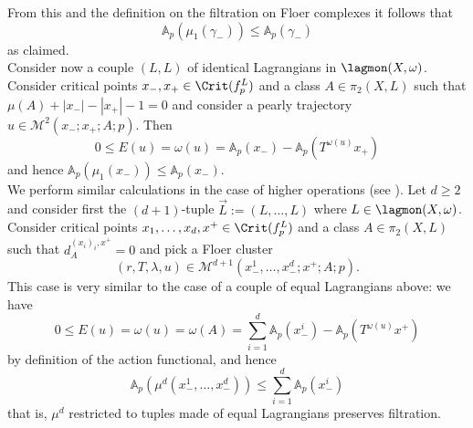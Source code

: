 	\noindent From this and the definition on the filtration on Floer complexes it follows that $$\mathbb{A}_p(\mu_1(\gamma_-))\leq \mathbb{A}_p(\gamma_-)$$ as claimed.\\ Consider now a couple $(L,L)$ of identical Lagrangians in $\lagmon(X,\omega)$. Consider critical points $x_-,x_+\in \Crit(f^L_p)$ and a class $A\in \pi_2(X,L)$ such that $\mu(A)+|x_-|-|x_+|-1=0$ and consider a pearly trajectory $u\in \mathcal{M}^2(x_-;x_+;A;p)$. Then $$0\leq E(u)= \omega(u) = \mathbb{A}_p(x_-)-\mathbb{A}_p(T^{\omega(u)}x_+)$$ and hence $\mathbb{A}_p(\mu_1(x_-))\leq\mathbb{A}_p(x_-)$.\\ 
	We perform similar calculations in the case of higher operations (see \cite{Se:book-fukaya-categ, Bi-Co:lcob-fuk}). Let $d\geq 2$ and consider first the $(d+1)$-tuple $\vec{L}:=(L,\ldots,L)$ where $L\in\lagmon(X,\omega)$. Consider critical points $x_1,\ldots,x_d,x^+\in \Crit(f^L_p)$ and a class $A\in \pi_2(X,L)$ such that $d_{A}^{(x_i)_i,x^+}=0$ and pick a Floer cluster $$(r,T,\lambda,u)\in \mathcal{M}^{d+1}(x_-^1,\ldots,x_-^d;x^+;A;p).$$ This case is very similar to the case of a couple of equal Lagrangians above: we have $$0\leq E(u)=\omega(u)=\omega(A) = \sum_{i=1}^d\mathbb{A}_p(x_-^i)-\mathbb{A}_p(T^{\omega(u)}x^+)$$ by definition of the action functional, and hence $$\mathbb{A}_p(\mu^d(x_-^1,\ldots,x_-^d))\leq \sum_{i=1}^d\mathbb{A}_p(x_-^i)$$ that is, $\mu^d$ restricted to tuples made of equal Lagrangians preserves filtration.
	

